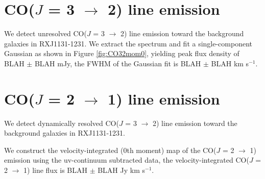 \documentclass[]{emulateapj}
\begin{document}
\author{Draft}




\section{CO($J$ = 3 $\rightarrow$ 2) line emission}


We detect unresolved CO($J$ = 3 $\rightarrow$ 2) line emission toward the background galaxies in RXJ1131-1231. 
We extract the spectrum and fit a single-component Gaussian as shown in Figure \ref{fig:CO32mom0}, 
yielding peak flux density of BLAH $\pm$ BLAH mJy, the FWHM of the Gaussian fit is BLAH $\pm$ BLAH km s$^{-1}$. 




\section{CO($J$ = 2 $\rightarrow$ 1) line emission}
We detect dynamically resolved CO($J$ = 3 $\rightarrow$ 2) line emission toward the background galaxies in RXJ1131-1231. 

We construct the velocity-integrated (0th moment) map of the CO($J$ = 2 $\rightarrow$ 1) emission using the uv-continuum subtracted data, the velocity-integrated CO($J$ = 2 $\rightarrow$ 1) line flux is BLAH $\pm$ BLAH Jy km s$^{-1}$.

\end{document}
